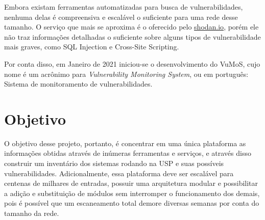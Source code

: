 Embora existam ferramentas automatizadas para busca de vulnerabilidades, nenhuma delas é compreensiva e escalável o suficiente para uma rede desse tamanho. O serviço que mais se aproxima é o oferecido pelo 
\url{shodan.io},
porém ele não traz informações detalhadas o suficiente sobre alguns tipos de vulnerabilidade mais graves, como 
SQL Injection e Cross-Site Scripting. 

Por conta disso, em Janeiro de 2021 iniciou-se o desenvolvimento do VuMoS, cujo nome é um acrônimo para \textit{Vulnerability Monitoring System}, ou em português: Sistema de monitoramento de vulnerabilidades.



\section{Objetivo}

O objetivo desse projeto, portanto, é concentrar em uma única plataforma as informações obtidas através de inúmeras ferramentas e serviços, e através disso construir um inventário dos sistemas rodando na USP e suas possíveis vulnerabilidades. Adicionalmente, essa plataforma deve ser escalável para centenas de milhares de entradas, possuir uma arquitetura modular e possibilitar a adição e substituição de módulos sem interromper o funcionamento dos demais, pois é possível que um escaneamento total demore diversas semanas por conta do tamanho da rede. 